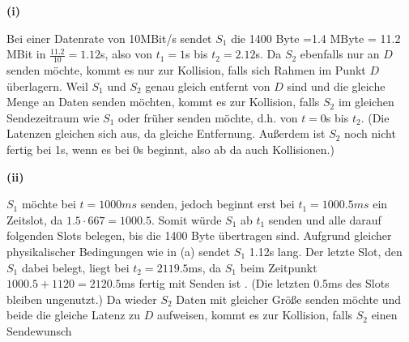 \documentclass{../exercisesheet}
\begin{document}
\begin{exercise}{1.5}
\begin{subexercise}
	
\end{subexercise}
\begin{subexercise}
	
\end{subexercise}
\begin{subexercise}
	
\end{subexercise}
\end{exercise}

\begin{exercise}{6}
\begin{subexercise}
\textbf{(i)}
\begin{adjustwidth}{2em}{0em}\vspace{-\baselineskip}
	Bei einer Datenrate von 10MBit/s sendet $S_1$ die 1400 Byte =1.4 MByte = 11.2 MBit in $\frac{11.2}{10}=1.12$s, also von $t_1=1$s bis $t_2=2.12$s. Da $S_2$ ebenfalls nur an
	$D$ senden möchte, kommt es nur zur Kollision, falls sich Rahmen im Punkt $D$ überlagern. Weil $S_1$ und $S_2$ genau gleich entfernt von $D$ sind und die gleiche Menge an Daten
 	senden möchten, kommt es zur Kollision, falls $S_2$ im gleichen Sendezeitraum wie $S_1$ oder früher senden möchte, d.h. von $t=0$s bis $t_2$. (Die Latenzen gleichen sich aus, da
	gleiche Entfernung. Außerdem ist $S_2$ noch nicht fertig bei 1s, wenn es bei 0s beginnt, also ab da auch Kollisionen.)\\
\end{adjustwidth}
\textbf{(ii)}
\begin{adjustwidth}{2em}{0em}\vspace{-\baselineskip}
	$S_1$ möchte bei $t=1000ms$ senden, jedoch beginnt erst bei $t_1=1000.5ms$ ein Zeitslot, da $1.5 \cdot 667 = 1000.5$. Somit würde $S_1$ ab $t_1$ senden und alle
	darauf folgenden Slots belegen, bis die 1400 Byte übertragen sind. Aufgrund gleicher physikalischer Bedingungen wie in (a) sendet $S_1$ 1.12s lang. Der letzte Slot,
	den $S_1$ dabei belegt, liegt bei $t_2=2119.5$ms, da $S_1$ beim Zeitpunkt $1000.5+1120=2120.5$ms fertig mit Senden ist . (Die letzten 0.5ms des Slots bleiben ungenutzt.) Da
	wieder $S_2$ Daten mit gleicher Größe senden möchte und beide die gleiche Latenz zu $D$ aufweisen, kommt es zur Kollision, falls $S_2$ einen Sendewunsch 

\end{adjustwidth}
\end{subexercise}
\end{exercise}
\end{document}
